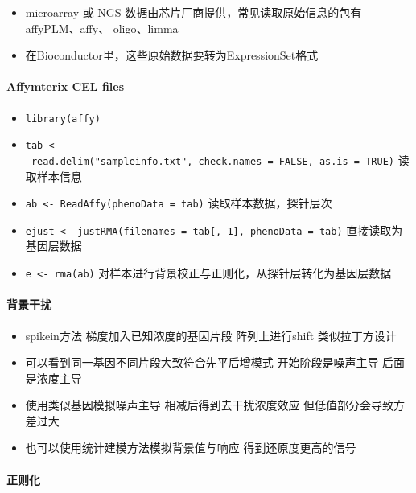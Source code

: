 \documentclass[
]{book}
\providecommand{\tightlist}{%
  \setlength{\itemsep}{0pt}\setlength{\parskip}{0pt}}
\begin{document}
\begin{itemize}
\tightlist
\item
  microarray 或 NGS 数据由芯片厂商提供，常见读取原始信息的包有affyPLM、affy、 oligo、limma
\item
  在Bioconductor里，这些原始数据要转为ExpressionSet格式
\end{itemize}

\hypertarget{affymterix-cel-files}{%
\paragraph{Affymterix CEL files}\label{affymterix-cel-files}}

\begin{itemize}
\tightlist
\item
  \texttt{library(affy)}
\item
  \texttt{tab\ \textless{}-\ read.delim("sampleinfo.txt",\ check.names\ =\ FALSE,\ as.is\ =\ TRUE)} 读取样本信息
\item
  \texttt{ab\ \textless{}-\ ReadAffy(phenoData\ =\ tab)} 读取样本数据，探针层次
\item
  \texttt{ejust\ \textless{}-\ justRMA(filenames\ =\ tab{[},\ 1{]},\ phenoData\ =\ tab)} 直接读取为基因层数据
\item
  \texttt{e\ \textless{}-\ rma(ab)} 对样本进行背景校正与正则化，从探针层转化为基因层数据
\end{itemize}

\hypertarget{ux80ccux666fux5e72ux6270}{%
\paragraph{背景干扰}\label{ux80ccux666fux5e72ux6270}}

\begin{itemize}
\tightlist
\item
  spikein方法 梯度加入已知浓度的基因片段 阵列上进行shift 类似拉丁方设计
\item
  可以看到同一基因不同片段大致符合先平后增模式 开始阶段是噪声主导 后面是浓度主导
\item
  使用类似基因模拟噪声主导 相减后得到去干扰浓度效应 但低值部分会导致方差过大
\item
  也可以使用统计建模方法模拟背景值与响应 得到还原度更高的信号
\end{itemize}

\hypertarget{ux6b63ux5219ux5316}{%
\paragraph{正则化}\label{ux6b63ux5219ux5316}}
\end{document}
